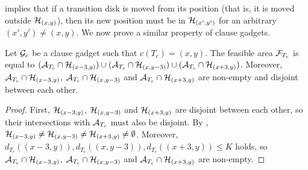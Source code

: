 \begin{toappendix}
\begin{toappendix}

 implies that if a transition disk is moved from its position (that is, it is moved outside $\mathcal{H}_{(x,y)}$), then its new position must be in $\mathcal{H}_{(x',y')}$ for an arbitrary $(x',y')\neq (x,y)$.
We now prove a similar property of clause gadgets.

\begin{mlemmarep}\label{lem:tc_three_subsets}
    Let $\mathcal{G}_{c}$ be a clause gadget such that $c(T_c) = (x,y)$.
    The feasible area $\mathcal{F}_{T_c}$ is equal to $(\mathcal{A}_{T_c} \cap \mathcal{H}_{(x-3,y)}) \cup (\mathcal{A}_{T_c} \cap \mathcal{H}_{(x,y-3)}) \cup (\mathcal{A}_{T_c} \cap \mathcal{H}_{(x+3,y)})$.
    Moreover, $\mathcal{A}_{T_c} \cap \mathcal{H}_{(x-3,y)}$, $\mathcal{A}_{T_c} \cap \mathcal{H}_{(x,y-3)}$ and $\mathcal{A}_{T_c} \cap \mathcal{H}_{(x+3,y)}$ are non-empty and disjoint between each other.
\end{mlemmarep}
\begin{proof}
    First, $\mathcal{H}_{(x-3,y)}$, $\mathcal{H}_{(x,y-3)}$ and $\mathcal{H}_{(x+3,y)}$ are disjoint between each other, so their intersections with $\mathcal{A}_{T_c}$ must also be disjoint.
    By , $\mathcal{H}_{(x-3,y)} \neq \mathcal{H}_{(x,y-3)} \neq \mathcal{H}_{(x+3,y)} \neq \emptyset$.
    Moreover, $d_{T_c}((x-3,y)),d_{T_c}((x,y-3)),d_{T_c}((x+3,y)) \le K$ holds, so $\mathcal{A}_{T_c} \cap \mathcal{H}_{(x-3,y)}$, $\mathcal{A}_{T_c} \cap \mathcal{H}_{(x,y-3)}$ and $\mathcal{A}_{T_c} \cap \mathcal{H}_{(x+3,y)}$ are non-empty.


\end{proof}
\end{toappendix}
\end{toappendix}
